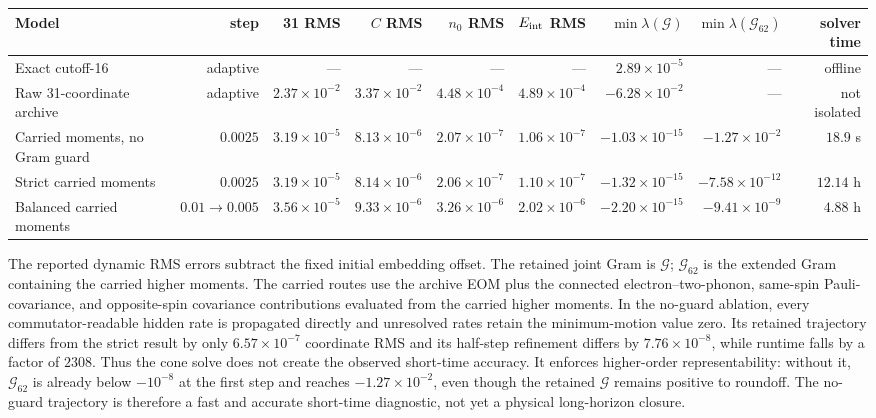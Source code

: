 \documentclass[10pt]{article}
\begin{document}
\begin{center}
  \tiny
  \setlength{\tabcolsep}{1.8pt}
  \begin{tabular}{@{}lrrrrrrrr@{}}
    \toprule
    Model & step & 31 RMS & $C$ RMS & $n_0$ RMS & $E_{\rm int}$ RMS
      & $\min\lambda(\mathcal G)$ & $\min\lambda(\mathcal G_{62})$
      & solver time \\
    \midrule
    Exact cutoff-16 & adaptive & --- & --- & --- & ---
      & $2.89\times10^{-5}$ & --- & offline \\
    Raw 31-coordinate archive & adaptive & $2.37\times10^{-2}$
      & $3.37\times10^{-2}$ & $4.48\times10^{-4}$
      & $4.89\times10^{-4}$ & $-6.28\times10^{-2}$ & --- & not isolated \\
    Carried moments, no Gram guard & $0.0025$ & $3.19\times10^{-5}$
      & $8.13\times10^{-6}$ & $2.07\times10^{-7}$
      & $1.06\times10^{-7}$ & $-1.03\times10^{-15}$
      & $-1.27\times10^{-2}$ & $18.9$ s \\
    Strict carried moments & $0.0025$ & $3.19\times10^{-5}$
      & $8.14\times10^{-6}$ & $2.06\times10^{-7}$
      & $1.10\times10^{-7}$ & $-1.32\times10^{-15}$
      & $-7.58\times10^{-12}$ & $12.14$ h \\
    Balanced carried moments & $0.01\to0.005$ & $3.56\times10^{-5}$
      & $9.33\times10^{-6}$ & $3.26\times10^{-6}$
      & $2.02\times10^{-6}$ & $-2.20\times10^{-15}$
      & $-9.41\times10^{-9}$ & $4.88$ h \\
    \bottomrule
  \end{tabular}
\end{center}
\vspace{-4pt}
{\footnotesize\noindent
The reported dynamic RMS errors subtract the fixed initial embedding offset.
The retained joint Gram is $\mathcal G$; $\mathcal G_{62}$ is the extended
Gram containing the carried higher moments. The carried routes use the
archive EOM plus the connected electron--two-phonon,
same-spin Pauli-covariance, and opposite-spin covariance contributions
evaluated from the carried higher moments. In the no-guard ablation, every
commutator-readable hidden rate is propagated directly and unresolved rates
retain the minimum-motion value zero. Its retained trajectory differs from
the strict result by only $6.57\times10^{-7}$ coordinate RMS and its half-step
refinement differs by $7.76\times10^{-8}$, while runtime falls by a factor of
$2308$. Thus the cone solve does not create the observed short-time accuracy.
It enforces higher-order representability: without it, $\mathcal G_{62}$ is
already below $-10^{-8}$ at the first step and reaches $-1.27\times10^{-2}$,
even though the retained $\mathcal G$ remains positive to roundoff. The
no-guard trajectory is therefore a fast and accurate short-time diagnostic,
not yet a physical long-horizon closure.\par}
\end{document}
